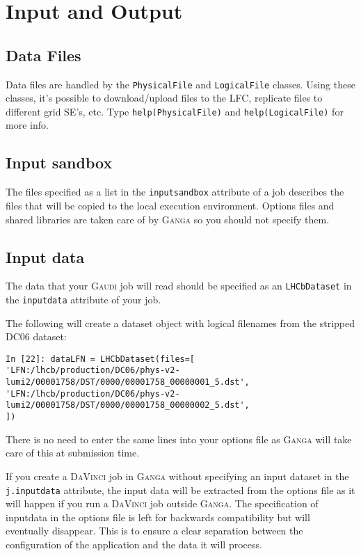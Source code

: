 \documentclass{howto}
\def\ganga {\textsc{Ganga}\xspace}
\def\gaudi {\textsc{Gaudi}\xspace}
\def\davinci {\textsc{DaVinci}\xspace}
\begin{document}
\section{Input and Output}
\label{sec:InOut}

\subsection{Data Files}
Data files are handled by the \texttt{PhysicalFile} and \texttt{LogicalFile} classes.  
Using these classes, it's possible to download/upload files to the LFC, replicate 
files to different grid SE's, etc.  Type \texttt{help(PhysicalFile)} and 
\texttt{help(LogicalFile)} for more info. 

\subsection{Input sandbox}
\label{sec:Inputsandbox}
The files specified as a list in the \texttt{inputsandbox} attribute of a job
describes the files that will be copied to the local execution environment.
Options files and shared libraries are taken care of by \ganga so you should
not specify them.

\subsection{Input data}
\label{sec:datasets}
The data that your \gaudi job will read should be specified as an
\texttt{LHCbDataset} in the \texttt{inputdata} attribute of your job.

The following will create a dataset object with logical filenames from the
stripped DC06 dataset:
\begin{verbatim}
In [22]: dataLFN = LHCbDataset(files=[
'LFN:/lhcb/production/DC06/phys-v2-lumi2/00001758/DST/0000/00001758_00000001_5.dst',
'LFN:/lhcb/production/DC06/phys-v2-lumi2/00001758/DST/0000/00001758_00000002_5.dst',
])
\end{verbatim}
There is no need to enter the same lines into your options file as \ganga will
take care of this at submission time.

If you create a \davinci job in \ganga without specifying an input dataset in
the \texttt{j.inputdata} attribute, the input data will be extracted from the
options file as it will happen if you run a \davinci job outside \ganga. The
specification of inputdata in the options file is left for backwards
compatibility but will eventually disappear. This is to ensure a clear
separation between the configuration of the application and the data it will
process.
\end{document}
